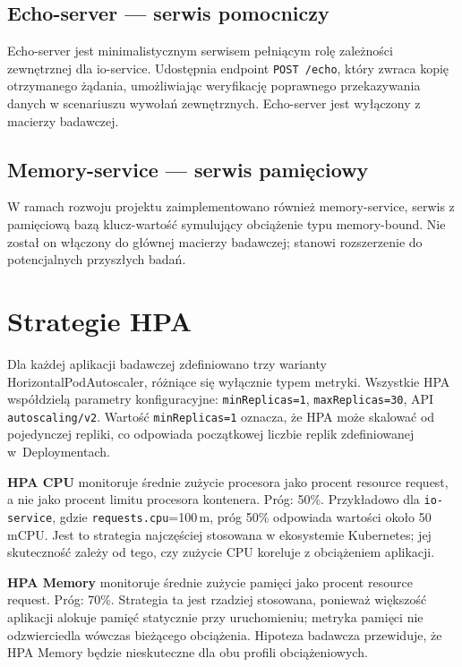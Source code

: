 \subsection{Echo-server — serwis pomocniczy}

Echo-server jest minimalistycznym serwisem pełniącym rolę zależności zewnętrznej dla io-service. Udostępnia endpoint \texttt{POST /echo}, który zwraca kopię otrzymanego żądania, umożliwiając weryfikację poprawnego przekazywania danych w scenariuszu wywołań zewnętrznych. Echo-server jest wyłączony z macierzy badawczej.

\subsection{Memory-service — serwis pamięciowy}

W ramach rozwoju projektu zaimplementowano również memory-service, serwis z pamięciową bazą klucz-wartość symulujący obciążenie typu memory-bound. Nie został on włączony do głównej macierzy badawczej; stanowi rozszerzenie do potencjalnych przyszłych badań.

\section{Strategie HPA}

Dla każdej aplikacji badawczej zdefiniowano trzy warianty HorizontalPodAutoscaler, różniące się wyłącznie typem metryki. Wszystkie HPA współdzielą parametry konfiguracyjne: \texttt{minReplicas=1}, \texttt{maxReplicas=30}, API \texttt{autoscaling/v2}. Wartość \texttt{minReplicas=1} oznacza, że HPA może skalować od pojedynczej repliki, co odpowiada początkowej liczbie replik zdefiniowanej w~Deploymentach.

\textbf{HPA CPU} monitoruje średnie zużycie procesora jako procent resource request, a nie jako procent limitu procesora kontenera. Próg: 50\%. Przykładowo dla \texttt{io-service}, gdzie \texttt{requests.cpu}=100\,m, próg 50\% odpowiada wartości około 50\,mCPU. Jest to strategia najczęściej stosowana w ekosystemie Kubernetes; jej skuteczność zależy od tego, czy zużycie CPU koreluje z obciążeniem aplikacji.

\textbf{HPA Memory} monitoruje średnie zużycie pamięci jako procent resource request. Próg: 70\%. Strategia ta jest rzadziej stosowana, ponieważ większość aplikacji alokuje pamięć statycznie przy uruchomieniu; metryka pamięci nie odzwierciedla wówczas bieżącego obciążenia. Hipoteza badawcza przewiduje, że HPA Memory będzie nieskuteczne dla obu profili obciążeniowych.

